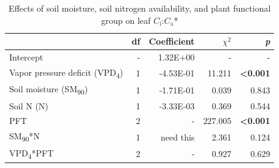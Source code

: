 \newpage
\begin{table}
    \centering
    \caption{Effects of soil moisture, soil nitrogen availability, and plant functional group on leaf $C_\mathrm{i}$:$C_\mathrm{a}$*}
        \begin{tabular}{p{6cm}p{0.5cm}p{2cm}p{1.5cm}p{1.5cm}}
            \hline 
            & \multicolumn{1}{r}{df} 
            & \multicolumn{1}{r}{Coefficient} 
            & \multicolumn{1}{r}{$\chi^{2}$} 
            & \multicolumn{1}{r}{\textit{p}} 
            \\ 
            \hline
            
            Intercept
            & \multicolumn{1}{r}{-}
            & \multicolumn{1}{r}{1.32E+00}
            & \multicolumn{1}{r}{-}
            & \multicolumn{1}{r}{-}
            \\

            Vapor pressure deficit (VPD\textsubscript{4})
            & \multicolumn{1}{r}{1}
            & \multicolumn{1}{r}{-4.53E-01}
            & \multicolumn{1}{r}{11.211}
            & \multicolumn{1}{r}{\textbf{<0.001}}
            \\

            Soil moisture (SM\textsubscript{90})
            & \multicolumn{1}{r}{1}
            & \multicolumn{1}{r}{-1.71E-01}
            & \multicolumn{1}{r}{0.039}
            & \multicolumn{1}{r}{0.843}
            \\

            Soil N (N)
            & \multicolumn{1}{r}{1}
            & \multicolumn{1}{r}{-3.33E-03}
            & \multicolumn{1}{r}{0.369}
            & \multicolumn{1}{r}{0.544}
            \\

            PFT
            & \multicolumn{1}{r}{2}
            & \multicolumn{1}{r}{-}
            & \multicolumn{1}{r}{227.005}
            & \multicolumn{1}{r}{\textbf{<0.001}}
            \\

            SM\textsubscript{90}*N
            & \multicolumn{1}{r}{1}
            & \multicolumn{1}{r}{need this}
            & \multicolumn{1}{r}{2.361}
            & \multicolumn{1}{r}{0.124}
            \\

            VPD\textsubscript{4}*PFT
            & \multicolumn{1}{r}{2}
            & \multicolumn{1}{r}{-}
            & \multicolumn{1}{r}{0.927}
            & \multicolumn{1}{r}{0.629}
            \\


\end{tabular}
\end{table}

